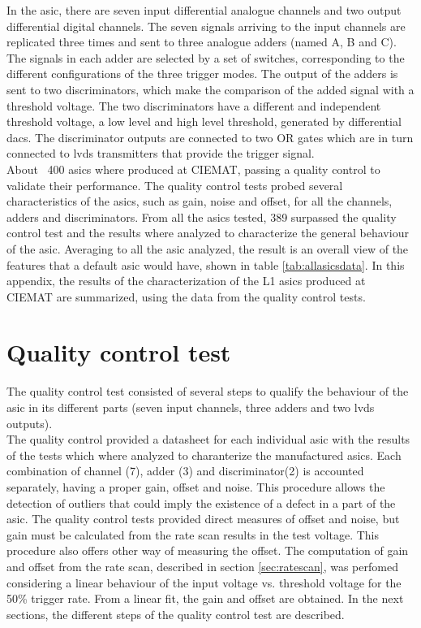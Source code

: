 \documentclass[main.tex]{subfiles}
\begin{document}
In the \gls{asic}, there are seven input differential analogue channels and two output differential digital channels. The seven signals arriving to the input channels are replicated three times and sent to three analogue adders (named A, B and C). The signals in each adder are selected by a set of switches, corresponding to the different configurations of the three trigger modes.
The output of the adders is sent to two discriminators, which make the comparison of the added signal with a threshold voltage.
The two discriminators have a different and independent threshold voltage, a low level and high level threshold, generated by differential \glspl{dac}.
The discriminator outputs are connected to two OR gates which are in turn connected to \gls{lvds} transmitters that provide the trigger signal.\\
About ~400 asics where produced at CIEMAT, passing a quality control to validate their performance. The quality control tests probed several characteristics of the \glspl{asic}, such as gain, noise and offset, for all the channels, adders and discriminators. From all the \glspl{asic} tested, 389 surpassed the quality control test and the results where analyzed to characterize the general behaviour of the \gls{asic}. Averaging to all the \gls{asic} analyzed, the result is an overall view of the features that a default \gls{asic} would have, shown in table \ref{tab:allasicsdata}. In this appendix, the results of the characterization of the L1 \glspl{asic} produced at CIEMAT are summarized, using the data from the quality control tests.

\section{Quality control test}

The quality control test consisted of several steps to qualify the behaviour of the \gls{asic} in its different parts (seven input channels, three adders and two \gls{lvds} outputs).\\
The quality control provided a datasheet for each individual \gls{asic} with the results of the tests which where analyzed to charanterize the manufactured \glspl{asic}. Each combination of channel (7), adder (3) and discriminator(2) is accounted separately, having a proper gain, offset and noise. This procedure allows the detection of outliers that could imply the existence of a defect in a part of the \gls{asic}. The quality control tests provided direct measures of offset and noise, but gain must be calculated from the rate scan results in the test voltage. This procedure also offers other way of measuring the offset. The computation of gain and offset from the rate scan, described in section \ref{sec:ratescan}, was perfomed considering a linear behaviour of the input voltage vs. threshold voltage for the 50\% trigger rate. From a linear fit, the gain and offset are obtained. In the next sections, the different steps of the quality control test are described.
\end{document}
